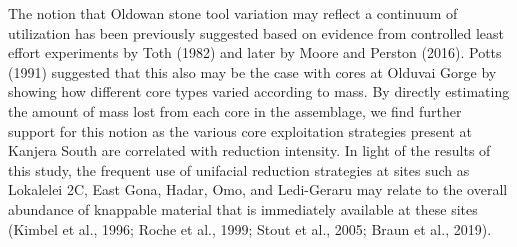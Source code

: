 \documentclass[]{elsarticle} %
\begin{document}
The notion that Oldowan stone tool variation may reflect a continuum of
utilization has been previously suggested based on evidence from
controlled least effort experiments by \hspace{0pt}Toth
(1982)\hspace{0pt} and later by \hspace{0pt}Moore and Perston
(2016)\hspace{0pt}. \hspace{0pt}Potts (1991)\hspace{0pt} suggested that
this also may be the case with cores at Olduvai Gorge by showing how
different core types varied according to mass. By directly estimating
the amount of mass lost from each core in the assemblage, we find
further support for this notion as the various core exploitation
strategies present at Kanjera South are correlated with reduction
intensity. In light of the results of this study, the frequent use of
unifacial reduction strategies at sites such as Lokalelei 2C, East Gona,
Hadar, Omo, and Ledi-Geraru may relate to the overall abundance of
knappable material that is immediately available at these sites
(\hspace{0pt}Kimbel et al., 1996\hspace{0pt}; \hspace{0pt}Roche et al.,
1999\hspace{0pt}; \hspace{0pt}Stout et al., 2005\hspace{0pt};
\hspace{0pt}Braun et al., 2019\hspace{0pt}).
\end{document}
